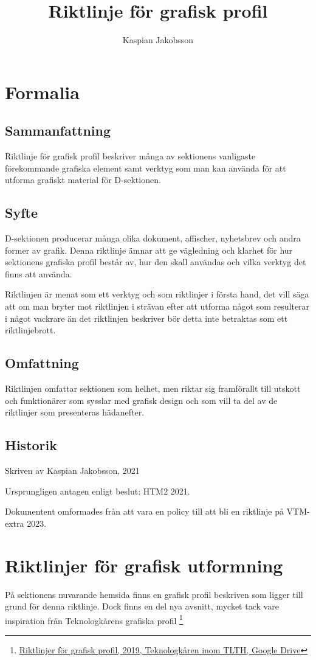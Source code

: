\documentclass[]{dsekprotokoll}
\title{Riktlinje för grafisk profil}
\author{Kaspian Jakobsson}
\begin{document}
\maketitle

\section{Formalia}

\subsection{Sammanfattning}
Riktlinje för grafisk profil beskriver många av sektionens vanligaste
förekommande grafiska element samt verktyg som man kan använda för
att utforma grafiskt material för D-sektionen.

\subsection{Syfte}
D-sektionen producerar många olika dokument, affischer, nyhetsbrev
och andra former av grafik. Denna riktlinje ämnar att ge vägledning
och klarhet för hur sektionens grafiska profil består av, hur den
skall användas och vilka verktyg det finns att använda.

Riktlinjen är menat som ett verktyg och som riktlinjer i första hand,
det vill säga att om man bryter mot riktlinjen i strävan efter att
utforma något som resulterar i något vackrare än det riktlinjen
beskriver bör detta inte betraktas som ett riktlinjebrott.

\subsection{Omfattning}
Riktlinjen omfattar sektionen som helhet, men riktar sig framförallt
till utskott och funktionärer som sysslar med grafisk design och som
vill ta del av de riktlinjer som presenteras hädanefter.

\subsection{Historik}
Skriven av Kaspian Jakobsson, 2021

Ursprungligen antagen enligt beslut:
HTM2 2021.

Dokumentent omformades från att vara en policy till att bli en
riktlinje på VTM-extra 2023.

\section{Riktlinjer för grafisk utformning}
På sektionens nuvarande hemsida finns en grafisk profil beskriven som
ligger till grund för denna riktlinje. Dock finns en del nya avsnitt,
mycket tack vare inspiration från Teknologkårens grafiska profil
\footnote{\href{https://drive.google.com/file/d/1EFdTyU6aXKSBEj4cqcDsR325LMzTP_um/view}{Riktlinjer
för grafisk profil, 2019, Teknologkåren inom TLTH, Google Drive}}
\end{document}
